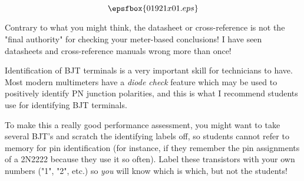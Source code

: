 

$$\epsfbox{01921x01.eps}$$

\vfil \eject






Contrary to what you might think, the datasheet or cross-reference is not the "final authority" for checking your meter-based conclusions!  I have seen datasheets and cross-reference manuals wrong more than once!







Identification of BJT terminals is a very important skill for technicians to have.  Most modern multimeters have a {\it diode check} feature which may be used to positively identify PN junction polarities, and this is what I recommend students use for identifying BJT terminals.

To make this a really good performance assessment, you might want to take several BJT's and scratch the identifying labels off, so students cannot refer to memory for pin identification (for instance, if they remember the pin assignments of a 2N2222 because they use it so often).  Label these transistors with your own numbers ("1", "2", etc.) so {\it you} will know which is which, but not the students!




